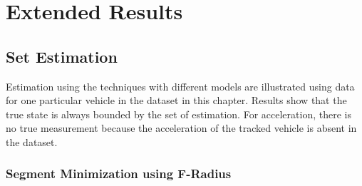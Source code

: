 \chapter{Extended Results} \label{ch:eresult}
\section{Set Estimation}\label{eresult:setest}
Estimation using the techniques with different models are illustrated using data for one particular vehicle in the dataset in this chapter. Results show that the true state is always bounded by the set of estimation. For acceleration, there is no true measurement because the acceleration of the tracked vehicle is absent in the dataset.
\FloatBarrier
\subsection{Segment Minimization using F-Radius}
\FloatBarrier
